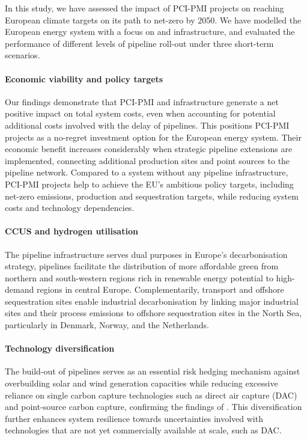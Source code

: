 \documentclass[preprint,12pt,sort&compress]{elsarticle}
\begin{document}
In this study, we have assessed the impact of PCI-PMI projects on reaching European climate targets on its path to net-zero by 2050. We have modelled the European energy system with a focus on  and  infrastructure, and evaluated the performance of different levels of pipeline roll-out under three short-term scenarios. 


\paragraph{Economic viability and policy targets}
Our findings demonstrate that PCI-PMI  and  infrastructure generate a net positive impact on total system costs, even when accounting for potential additional costs involved with the delay of pipelines. This positions PCI-PMI projects as a no-regret investment option for the European energy system. 
Their economic benefit increases considerably when strategic pipeline extensions are implemented, connecting additional  production sites and  point sources to the pipeline network. 
Compared to a system without any pipeline infrastructure, PCI-PMI projects help to achieve the EU's ambitious policy targets, including net-zero emissions,  production and  sequestration targets, while reducing system costs and technology dependencies.

\paragraph{CCUS and hydrogen utilisation}
The pipeline infrastructure serves dual purposes in Europe's decarbonisation strategy,  pipelines facilitate the distribution of more affordable green  from northern and south-western regions rich in renewable energy potential to high-demand regions in central Europe. Complementarily,  transport and offshore sequestration sites enable industrial decarbonisation by linking major industrial sites and their process emissions to offshore sequestration sites in the North Sea, particularly in Denmark, Norway, and the Netherlands.

\paragraph{Technology diversification}
The build-out of pipelines serves as an essential risk hedging mechanism against overbuilding solar and wind generation capacities while reducing excessive reliance on single carbon capture technologies such as direct air capture (DAC) and point-source carbon capture, confirming the findings of \cite{hofmannH2CO2Network2025}. This diversification further enhances system resilience towards uncertainties involved with technologies that are not yet commercially available at scale, such as DAC.
\end{document}
